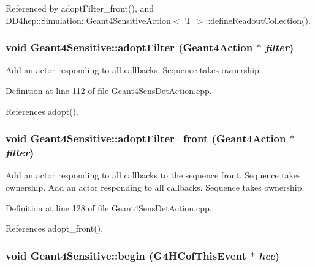 Referenced by adoptFilter\_\-front(), and DD4hep::Simulation::Geant4SensitiveAction$<$ T $>$::defineReadoutCollection().\hypertarget{class_d_d4hep_1_1_simulation_1_1_geant4_sensitive_a54a242570db8df04bcf260d2e0ea3018}{
\subsubsection[{adoptFilter}]{\setlength{\rightskip}{0pt plus 5cm}void Geant4Sensitive::adoptFilter ({\bf Geant4Action} $\ast$ {\em filter})}}
\label{class_d_d4hep_1_1_simulation_1_1_geant4_sensitive_a54a242570db8df04bcf260d2e0ea3018}


Add an actor responding to all callbacks. Sequence takes ownership. 

Definition at line 112 of file Geant4SensDetAction.cpp.

References adopt().\hypertarget{class_d_d4hep_1_1_simulation_1_1_geant4_sensitive_a923ce4e474920fab8d2c7c6762e82ef4}{
\subsubsection[{adoptFilter\_\-front}]{\setlength{\rightskip}{0pt plus 5cm}void Geant4Sensitive::adoptFilter\_\-front ({\bf Geant4Action} $\ast$ {\em filter})}}
\label{class_d_d4hep_1_1_simulation_1_1_geant4_sensitive_a923ce4e474920fab8d2c7c6762e82ef4}


Add an actor responding to all callbacks to the sequence front. Sequence takes ownership. Add an actor responding to all callbacks. Sequence takes ownership. 

Definition at line 128 of file Geant4SensDetAction.cpp.

References adopt\_\-front().\hypertarget{class_d_d4hep_1_1_simulation_1_1_geant4_sensitive_a2967b095e6c32ae82f68a8b25a086c86}{
\subsubsection[{begin}]{\setlength{\rightskip}{0pt plus 5cm}void Geant4Sensitive::begin (G4HCofThisEvent $\ast$ {\em hce})}}
\label{class_d_d4hep_1_1_simulation_1_1_geant4_sensitive_a2967b095e6c32ae82f68a8b25a086c86}


